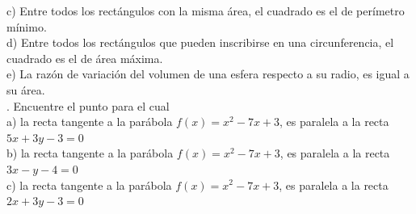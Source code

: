\documentclass[letterpaper]{article}
\begin{document}

c) Entre todos los rectángulos con la misma área, el cuadrado es el de perímetro mínimo.\\


d) Entre todos los rectángulos que pueden inscribirse en una circunferencia, el cuadrado es el de área máxima.\\


e) La razón de variación del volumen de una esfera respecto a su radio, es igual a su área.\\


. Encuentre el punto para el cual\\

a) la recta tangente a la parábola $ f(x)= x^2 - 7x + 3 $, es paralela a la recta $ 5x + 3y - 3 = 0 $\\


b) la recta tangente a la parábola $ f (x) = x^2 -7x+3 $, es paralela a la recta $ 3x-y-4 =0 $\\


c) la recta tangente a la parábola $ f (x) = x^2 -7x+3 $, es paralela a la recta $ 2x + 3y - 3 = 0 $\\

\end{document}

